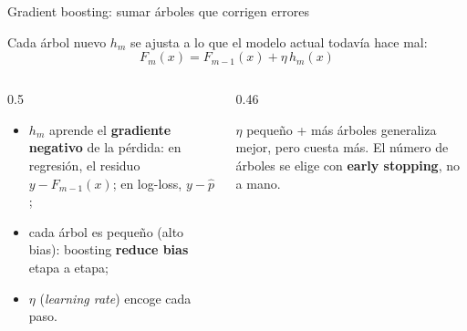 \documentclass[aspectratio=169,12pt]{beamer}
\begin{document}
\begin{frame}{Gradient boosting: sumar árboles que corrigen errores}
  \begin{center}
    Cada árbol nuevo $h_m$ se ajusta a lo que el modelo actual todavía hace mal:
    \[ F_m(x) = F_{m-1}(x) + \eta\, h_m(x) \]
  \end{center}
  \begin{columns}[T]
    \begin{column}{0.5\textwidth}
      \small
      \begin{itemize}
        \item $h_m$ aprende el \textbf{gradiente negativo} de la pérdida: en regresión, el residuo $y - F_{m-1}(x)$; en log-loss, $y - \hat{p}$;
        \item cada árbol es pequeño (alto bias): boosting \textbf{reduce bias} etapa a etapa;
        \item $\eta$ (\emph{learning rate}) encoge cada paso.
      \end{itemize}
    \end{column}
    \begin{column}{0.46\textwidth}
      \begin{keybox}
        \small $\eta$ pequeño + más árboles generaliza mejor, pero cuesta más. El número de árboles se elige con \textbf{early stopping}, no a mano.
      \end{keybox}
    \end{column}
  \end{columns}
\end{frame}
\end{document}
